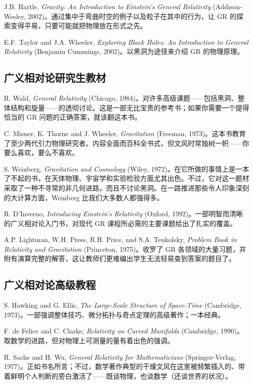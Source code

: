 J.B. Hartle, \emph{Gravity: An Introduction to Einstein's General Relativity} (Addison-Wesley, 2002)。通过集中于弯曲时空的例子以及粒子在其中的行为，让 GR 的探索变得平易，只要可能就把物理放在形式之先。

E.F. Taylor and J.A. Wheeler, \emph{Exploring Black Holes: An Introduction to General Relativity} (Benjamin Cummings, 2002)。以黑洞为途径来介绍 GR 的物理原理。

\subsection*{广义相对论研究生教材}

R. Wald, \emph{General Relativity} (Chicago, 1984)。对许多高级课题——包括黑洞、整体结构和旋量——的透彻讨论。这是一部无比宝贵的参考书；如果你需要一个提得恰当的 GR 问题的正确答案，就该翻这本书。

C. Misner, K. Thorne and J. Wheeler, \emph{Gravitation} (Freeman, 1973)。这本书教育了至少两代引力物理研究者。内容全面而百科全书式，但文风时常独树一帜——你要么喜欢，要么不喜欢。

S. Weinberg, \emph{Gravitation and Cosmology} (Wiley, 1972)。在它所做的事情上是一本了不起的书，在天体物理、宇宙学和实验检验方面尤其出色。不过，它对这一题材采取了一种不寻常的非几何进路，而且不讨论黑洞。在一路推进那些令人印象深刻的大计算方面，Weinberg 比我们大多数人都强得多。

R. D'Inverno, \emph{Introducing Einstein's Relativity} (Oxford, 1992)。一部明智而清晰的广义相对论入门书，对现代 GR 课程所必需的主要课题给出了扎实的覆盖。

A.P. Lightman, W.H. Press, R.H. Price, and S.A. Teukolsky, \emph{Problem Book in Relativity and Gravitation} (Princeton, 1975)。收罗了 GR 各领域的大量习题，并附有演算完整的解答，这让教师们更难编出学生无法轻易查到答案的题目了。

\subsection*{广义相对论高级教程}

S. Hawking and G. Ellis, \emph{The Large-Scale Structure of Space-Time} (Cambridge, 1973)。一部强调整体技巧、微分拓扑与奇点定理的高级著作；一本经典。

F. de Felice and C. Clarke, \emph{Relativity on Curved Manifolds} (Cambridge, 1990)。取数学的进路，但对物理上可测量的量有着出色的强调。

R. Sachs and H. Wu, \emph{General Relativity for Mathematicians} (Springer-Verlag, 1977)。正如书名所言；不过，数学著作典型的干燥文风在这里被频繁插入的、带着鲜明个人判断的旁白激活了——既谈物理，也谈数学（还谈世界的状况）。


